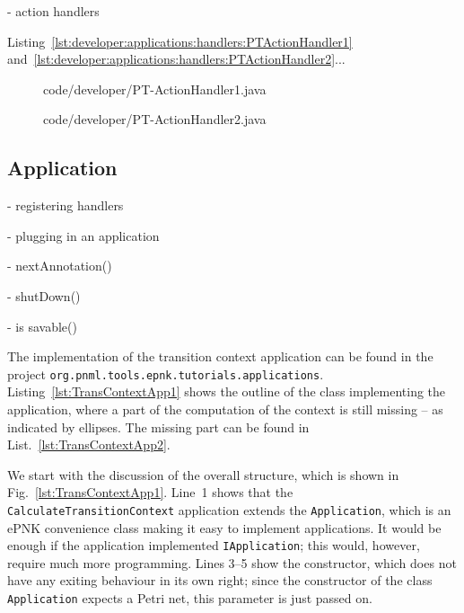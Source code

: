 - action handlers

Listing~\ref{lst:developer:applications:handlers:PTActionHandler1}
and~\ref{lst:developer:applications:handlers:PTActionHandler2}...

\begin{figure}[htbp!]
%
  {code/developer/PT-ActionHandler1.java}
\end{figure}

\begin{figure}[htbp!]
%
  {code/developer/PT-ActionHandler2.java}
\end{figure}



\subsection{Application}
\label{subsec:developer:applications:application}

- registering handlers

- plugging in an application

- nextAnnotation()

- shutDown()

- is savable()


The implementation of the transition context application can be found
in the project {\tt org.pnml.tools.epnk.tutorials.applications}.
Listing~\ref{lst:TransContextApp1} shows the outline of the class implementing
the application, where a part of the computation of the context is still missing
-- as indicated by ellipses. The missing part can be found in
List.~\ref{lst:TransContextApp2}.

We start with the discussion of the overall structure, which is shown in
Fig.~\ref{lst:TransContextApp1}. Line~1 shows that the {\tt CalculateTransitionContext}
application extends the {\tt Application}, which is an ePNK convenience class
making it easy to implement applications. It would be enough if the application
implemented {\tt IApplication}; this would, however, require much more programming.
Lines 3--5 show the constructor, which does not have any exiting behaviour in
its own right; since the constructor of the class {\tt Application} expects a
Petri net, this parameter is just passed on.

